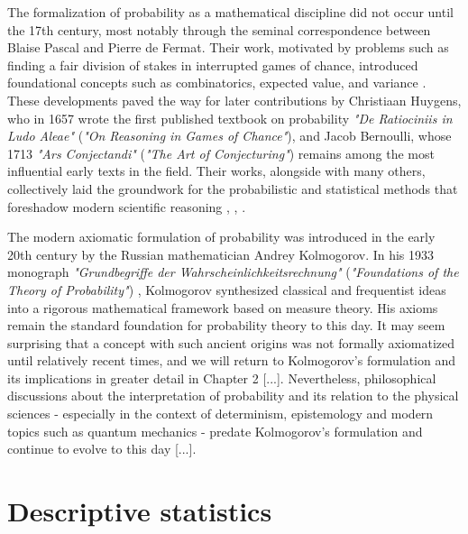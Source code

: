 \documentclass{book}
\begin{document}
\medskip

The formalization of probability as a mathematical discipline did not occur until the 17th century, most notably through the seminal correspondence between Blaise Pascal and Pierre de Fermat. Their work, motivated by problems such as finding a fair division of stakes in interrupted games of chance, introduced foundational concepts such as combinatorics, expected value, and variance \cite{devlin2008unfinished}. These developments paved the way for later contributions by Christiaan Huygens, who in 1657 wrote the first published textbook on probability \textit{"De Ratiociniis in Ludo Aleae"} (\textit{"On Reasoning in Games of Chance"}), and Jacob Bernoulli, whose 1713 \textit{"Ars Conjectandi"} (\textit{"The Art of Conjecturing"}) remains among the most influential early texts in the field. Their works, alongside with many others, collectively laid the groundwork for the probabilistic and statistical methods that foreshadow modern scientific reasoning \cite{huygens1657ratiociniis}, \cite{bernoulli1713ars}, \cite{hald1990history}.

\medskip

The modern axiomatic formulation of probability was introduced in the early 20th century by the Russian mathematician Andrey Kolmogorov. In his 1933 monograph \textit{"Grundbegriffe der Wahrscheinlichkeitsrechnung"} (\textit{"Foundations of the Theory of Probability"}) \cite{kolmogorov1933grundbegriffe}, Kolmogorov synthesized classical and frequentist ideas into a rigorous mathematical framework based on measure theory. His axioms remain the standard foundation for probability theory to this day. It may seem surprising that a concept with such ancient origins was not formally axiomatized until relatively recent times, and we will return to Kolmogorov’s formulation and its implications in greater detail in Chapter 2 [...]. Nevertheless, philosophical discussions about the interpretation of probability and its relation to the physical sciences - especially in the context of determinism, epistemology and modern topics such as quantum mechanics - predate Kolmogorov's formulation and continue to evolve to this day [...].



\chapter{Descriptive statistics}
\end{document}
